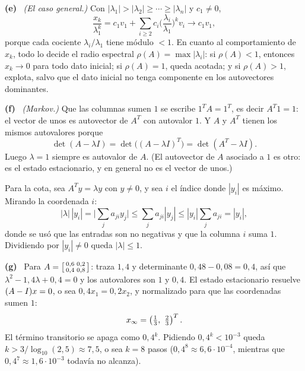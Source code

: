\documentclass[11pt,a4paper]{article}
\newcommand{\bi}[1]{\boldsymbol{#1}}
\newcommand{\n}[1]{\boldsymbol{#1}}
\DeclareMathOperator{\gen}{span}
\DeclareMathOperator{\tr}{tr}
\DeclareMathOperator{\rg}{rg}
\def\n#1{#1}\def\bi#1{#1}\def\rg{rg}\def\tr{tr}\def\gen{span}%
\newcommand{\itemsol}[1]{\par\medskip\noindent\textbf{(#1)}\ \ignorespaces}
\begin{document}
\itemsol{e} \emph{(El caso general.)} Con
$|\lambda_1|>|\lambda_2|\ge\cdots\ge|\lambda_n|$ y $c_1\neq0$,
\[
\frac{\n x_k}{\lambda_1^{k}}
=c_1\n v_1+\sum_{i\ge2}c_i\Big(\frac{\lambda_i}{\lambda_1}\Big)^{k}\n v_i
\longrightarrow c_1\n v_1 ,
\]
porque cada cociente $\lambda_i/\lambda_1$ tiene módulo $<1$. En cuanto al
comportamiento de $\n x_k$, todo lo decide el radio espectral
$\rho(A)=\max|\lambda_i|$: si $\rho(A)<1$, entonces $\n x_k\to\n0$ para todo dato
inicial; si $\rho(A)=1$, queda acotada; y si $\rho(A)>1$, explota, salvo que el
dato inicial no tenga componente en los autovectores dominantes.

\itemsol{f} \emph{(Markov.)} Que las columnas sumen $1$ se escribe
$\n1^TA=\n1^T$, es decir $A^T\n1=\n1$: el vector de unos es autovector de $A^T$
con autovalor $1$. Y $A$ y $A^T$ tienen los mismos autovalores porque
\[
\det(A-\lambda I)=\det\big((A-\lambda I)^T\big)=\det(A^T-\lambda I).
\]
Luego $\lambda=1$ siempre es autovalor de $A$. (El autovector de $A$ asociado a
$1$ es otro: es el estado estacionario, y en general no es el vector de unos.)

Para la cota, sea $A^T\n y=\lambda\n y$ con $\n y\neq\n0$, y sea $i$ el índice
donde $|y_i|$ es máximo. Mirando la coordenada $i$:
\[
|\lambda|\,|y_i|=\Big|\sum_j a_{ji}y_j\Big|\le\sum_j a_{ji}|y_j|
\le|y_i|\sum_j a_{ji}=|y_i| ,
\]
donde se usó que las entradas son no negativas y que la columna $i$ suma $1$.
Dividiendo por $|y_i|\neq0$ queda $|\lambda|\le1$.

\itemsol{g} Para
$A=\begin{bsmallmatrix}0{,}6&0{,}2\\0{,}4&0{,}8\end{bsmallmatrix}$: traza
$1{,}4$ y determinante $0{,}48-0{,}08=0{,}4$, así que
$\lambda^2-1{,}4\lambda+0{,}4=0$ y los autovalores son $1$ y $0{,}4$. El estado
estacionario resuelve $(A-I)\bx=\n0$, o sea $0{,}4x_1=0{,}2x_2$, y normalizado
para que las coordenadas sumen $1$:
\[
\bx_\infty=\left(\tfrac13,\ \tfrac23\right)^T .
\]
El término transitorio se apaga como $0{,}4^k$. Pidiendo $0{,}4^k<10^{-3}$ queda
$k>3/\log_{10}(2{,}5)\approx7{,}5$, o sea $k=8$ pasos ($0{,}4^8\approx6{,}6\cdot10^{-4}$,
mientras que $0{,}4^7\approx1{,}6\cdot10^{-3}$ todavía no alcanza).
\end{document}
